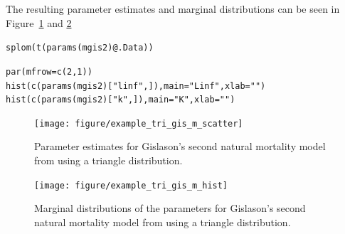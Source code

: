 \documentclass[a4paper,english,10pt]{article}\usepackage[]{graphicx}\usepackage[]{color}
\makeatletter
\newcommand{\hlnum}[1]{\textcolor[rgb]{0.2,0.2,0.2}{#1}}%
\newcommand{\hlstr}[1]{\textcolor[rgb]{0.2,0.2,0.2}{#1}}%
\newcommand{\hlopt}[1]{\textcolor[rgb]{0.2,0.2,0.2}{#1}}%
\newcommand{\hlstd}[1]{\textcolor[rgb]{0,0,0}{#1}}%
\newcommand{\hlkwc}[1]{\textcolor[rgb]{0.361,0.506,0.596}{#1}}%
\newcommand{\hlkwd}[1]{\textcolor[rgb]{0.361,0.506,0.596}{#1}}%
\newenvironment{kframe}{%
 \def\at@end@of@kframe{}%
 \ifinner\ifhmode%
  \def\at@end@of@kframe{\end{minipage}}%
  \begin{minipage}{\columnwidth}%
 \fi\fi%
 \def\FrameCommand##1{\hskip\@totalleftmargin \hskip-\fboxsep
 \colorbox{shadecolor}{##1}\hskip-\fboxsep
     \hskip-\linewidth \hskip-\@totalleftmargin \hskip\columnwidth}%
 \MakeFramed {\advance\hsize-\width
   \@totalleftmargin\z@ \linewidth\hsize
   \@setminipage}}%
 {\par\unskip\endMakeFramed%
 \at@end@of@kframe}
\newenvironment{knitrout}{}{} %
\makeatother
\begin{document}
The resulting parameter estimates and marginal distributions can be seen in Figure~\ref{fig:plot_tri_gis_m} and \ref{fig:plot_tri_gis_m_hist}

\begin{knitrout}
\color{fgcolor}\begin{kframe}
\begin{alltt}
\hlkwd{splom}\hlstd{(}\hlkwd{t}\hlstd{(}\hlkwd{params}\hlstd{(mgis2)}\hlopt{@}\hlkwc{.Data}\hlstd{))}
\end{alltt}
\end{kframe}
\end{knitrout}


\begin{knitrout}
\color{fgcolor}\begin{kframe}
\begin{alltt}
\hlkwd{par}\hlstd{(}\hlkwc{mfrow} \hlstd{=} \hlkwd{c}\hlstd{(}\hlnum{2}\hlstd{,} \hlnum{1}\hlstd{))}
\hlkwd{hist}\hlstd{(}\hlkwd{c}\hlstd{(}\hlkwd{params}\hlstd{(mgis2)[}\hlstr{"linf"}\hlstd{, ]),} \hlkwc{main} \hlstd{=} \hlstr{"Linf"}\hlstd{,} \hlkwc{xlab} \hlstd{=} \hlstr{""}\hlstd{)}
\hlkwd{hist}\hlstd{(}\hlkwd{c}\hlstd{(}\hlkwd{params}\hlstd{(mgis2)[}\hlstr{"k"}\hlstd{, ]),} \hlkwc{main} \hlstd{=} \hlstr{"K"}\hlstd{,} \hlkwc{xlab} \hlstd{=} \hlstr{""}\hlstd{)}
\end{alltt}
\end{kframe}
\end{knitrout}


\begin{figure}[h]
\begin{knitrout}
\color{fgcolor}

{\centering \texttt{[image: figure/example\_tri\_gis\_m\_scatter]} 

}



\end{knitrout}

\caption{Parameter estimates for Gislason's second natural mortality model from using a triangle distribution.}
\label{fig:plot_tri_gis_m}
\end{figure}

\begin{figure}[h]
\begin{knitrout}
\color{fgcolor}

{\centering \texttt{[image: figure/example\_tri\_gis\_m\_hist]} 

}



\end{knitrout}

\caption{Marginal distributions of the parameters for Gislason's second natural mortality model from using a triangle distribution.}
\label{fig:plot_tri_gis_m_hist}
\end{figure}
\end{document}
